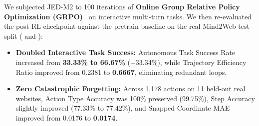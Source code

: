 \documentclass[10pt,twocolumn,letterpaper]{article}
\begin{document}
We subjected JED-M2 to 100 iterations of \textbf{Online Group Relative Policy Optimization (GRPO)}~\cite{shao2024deepseekmath} on interactive multi-turn tasks. We then re-evaluated the post-RL checkpoint against the pretrain baseline on the real Mind2Web test split ( and ):
\begin{itemize}[leftmargin=*]
    \item \textbf{Doubled Interactive Task Success:} Autonomous Task Success Rate increased from \textbf{33.33\% to 66.67\%} (+33.34\%), while Trajectory Efficiency Ratio improved from 0.2381 to \textbf{0.6667}, eliminating redundant loops.
    \item \textbf{Zero Catastrophic Forgetting:} Across 1,178 actions on 11 held-out real websites, Action Type Accuracy was 100\% preserved (99.75\%), Step Accuracy slightly improved (77.33\% to 77.42\%), and Snapped Coordinate MAE improved from 0.0176 to \textbf{0.0174}.
\end{itemize}

\begin{table}[t]
\centering
\small
{}
\caption{\textbf{Online GRPO Interactive Task Gains and Unseen Generalization (\texorpdfstring{$N=147$}{N=147} Tasks, $1,178$ Actions).} Demonstrates doubling of interactive task completion with zero catastrophic forgetting.}
\label{tab:grpo}
\end{table}
\end{document}
